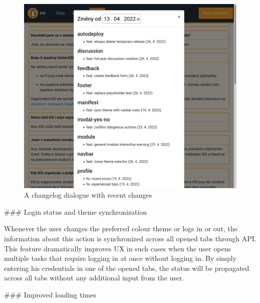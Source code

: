 \documentclass[
  digital, %
  oneside, %
  lof,     %
  nolot,     %
]{fithesis4}
\begin{document}
{\begin{figure}
\includegraphics[width=\textwidth]{assets/img/changelog}
\caption{A changelog dialogue with recent changes}
\label{fig:changelog}
\end{figure}

### Login status and theme synchronization

Whenever the user changes the preferred colour theme or logs in or out, the information about this action is synchronized across all opened tabs through  API. This feature dramatically improves UX in such cases when the user opens multiple tasks that require logging in at once without logging in. By simply entering his credentials in one of the opened tabs, the status will be propagated across all tabs without any additional input from the user.

### Improved loading times
\label{chap:faster}

}
\end{document}
